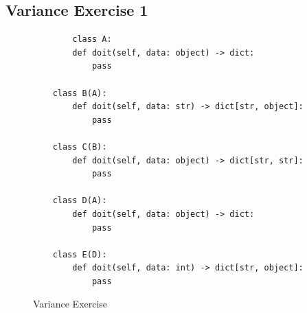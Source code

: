 \documentclass[oneside,11pt,dvipsnames]{book}
\newcommand{\code}[1]{\texttt{#1}}
\begin{document}












\subsection{Variance Exercise 1}\label{ex:variance1}

\begin{figure}
    \begin{lstlisting}
        class A:
        def doit(self, data: object) -> dict:
            pass
    
    class B(A):
        def doit(self, data: str) -> dict[str, object]:
            pass
    
    class C(B):
        def doit(self, data: object) -> dict[str, str]:
            pass
    
    class D(A):
        def doit(self, data: object) -> dict:
            pass
    
    class E(D):
        def doit(self, data: int) -> dict[str, object]:
            pass
    \end{lstlisting}
    \caption{Variance Exercise}\label{fig:variance1}    
\end{figure}
\end{document}
